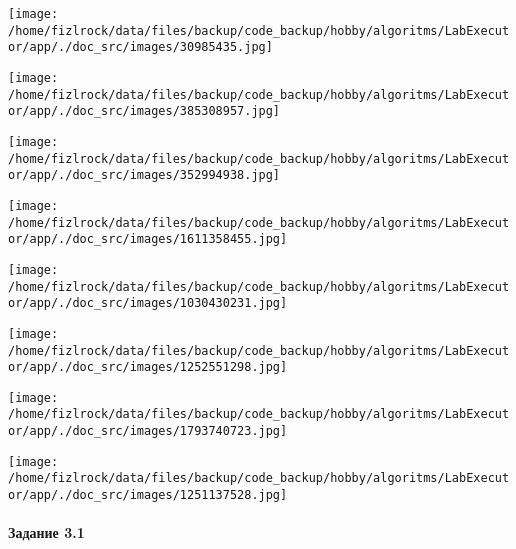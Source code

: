 \documentclass[a4paper, 12pt]{article}
\begin{document}
\texttt{[image: /home/fizlrock/data/files/backup/code\_backup/hobby/algoritms/LabExecutor/app/./doc\_src/images/30985435.jpg]}

\texttt{[image: /home/fizlrock/data/files/backup/code\_backup/hobby/algoritms/LabExecutor/app/./doc\_src/images/385308957.jpg]}

\texttt{[image: /home/fizlrock/data/files/backup/code\_backup/hobby/algoritms/LabExecutor/app/./doc\_src/images/352994938.jpg]}

\texttt{[image: /home/fizlrock/data/files/backup/code\_backup/hobby/algoritms/LabExecutor/app/./doc\_src/images/1611358455.jpg]}

\texttt{[image: /home/fizlrock/data/files/backup/code\_backup/hobby/algoritms/LabExecutor/app/./doc\_src/images/1030430231.jpg]}

\texttt{[image: /home/fizlrock/data/files/backup/code\_backup/hobby/algoritms/LabExecutor/app/./doc\_src/images/1252551298.jpg]}

\texttt{[image: /home/fizlrock/data/files/backup/code\_backup/hobby/algoritms/LabExecutor/app/./doc\_src/images/1793740723.jpg]}

\texttt{[image: /home/fizlrock/data/files/backup/code\_backup/hobby/algoritms/LabExecutor/app/./doc\_src/images/1251137528.jpg]}
\pagebreak
\paragraph{Задание 3.1}
\end{document}
